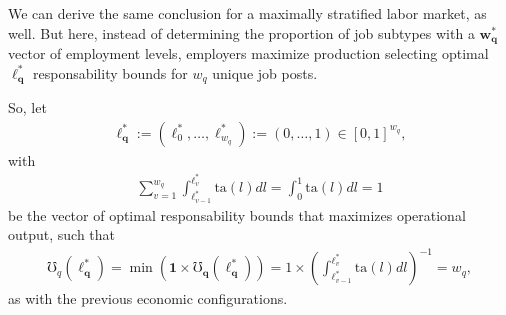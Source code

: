 \documentclass[hidelinks, nonatbib]{elsarticle}
\begin{document}
\begin{enumerate}

    We can derive the same conclusion for a maximally stratified labor market, as well. But here, instead of determining the proportion of job subtypes with a $\boldsymbol{w_{q}^{*}}$ vector of employment levels, employers maximize production selecting optimal $\boldsymbol{\ell_{q}^{*}}$ responsability bounds for $w_q$ unique job posts.

    So, let 
    \begin{gather}
        \boldsymbol{\ell_{q}^{*}}
        :=
        (\ell_{0}^{*}, \dots, \ell_{w_q}^{*})
        :=
        (0, \dots, 1) 
        \in [0,1]^{w_q}
        ,
    \end{gather}
    with
    \begin{gather}
    \sum_{v=1}^{w_q}
    \int_{
        \ell_{v-1}^{*}
    }^{
        \ell_{v}^{*}
    }
    \text{ta}(l)dl
    =
    \int_{0}^{1}
    \text{ta}(l)dl
    =
    1
    \end{gather}
    be the vector of optimal responsability bounds that maximizes operational output, such that
    \begin{gather}
        \mho_{q}(\boldsymbol{\ell_{q}^{*}})
        =
        \min(
            \boldsymbol{1}
            \times
            \boldsymbol{\mho_q}(
                \boldsymbol{\ell_{q}^{*}}
            )
        )
        =
        1
        \times
        \left(
            \int_{
                \ell_{v-1}^{*}
            }^{
                \ell_{v}^{*}
            }
            \text{ta}(l)dl
        \right) ^ {-1}
        =
        w_q
        ,
    \end{gather}
    as with the previous economic configurations.
    

\end{enumerate}
\end{document}
